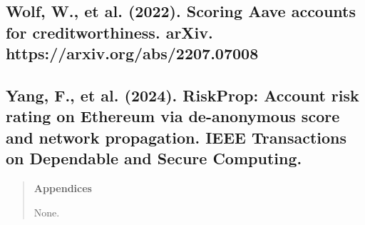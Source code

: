 \documentclass[
]{article}
\begin{document}
\subsection{Wolf, W., et al. (2022). Scoring Aave accounts for creditworthiness. arXiv. https://arxiv.org/abs/2207.07008}\label{wolf-w.-et-al.-2022.-scoring-aave-accounts-for-creditworthiness.-arxiv.-httpsarxiv.orgabs2207.07008}

\subsection{Yang, F., et al. (2024). RiskProp: Account risk rating on Ethereum via de-anonymous score and network propagation. IEEE Transactions on Dependable and Secure Computing.}\label{yang-f.-et-al.-2024.-riskprop-account-risk-rating-on-ethereum-via-de-anonymous-score-and-network-propagation.-ieee-transactions-on-dependable-and-secure-computing.}

\begin{quote}
\textbf{Appendices}

None.
\end{quote}
\end{document}
